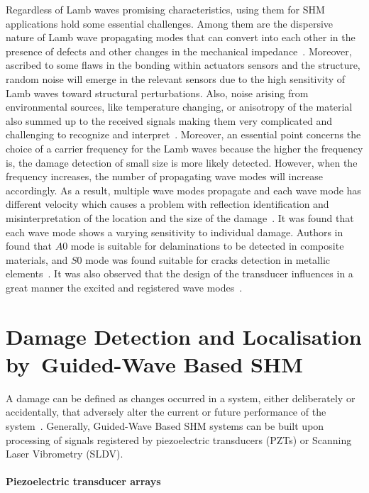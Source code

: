 Regardless of Lamb waves promising characteristics, using them for SHM 
applications hold some essential challenges. 
Among them are the dispersive nature of Lamb wave propagating modes that can convert into each other in the presence of defects and other changes in the mechanical 
impedance~\cite{Willberg2015}. 
Moreover, ascribed to some flaws in the bonding within actuators sensors and 
the structure, random noise will emerge in the relevant sensors due to the high 
sensitivity of Lamb waves toward structural perturbations. 
Also, noise arising from environmental sources, like temperature changing, or 
anisotropy of the material also summed up to the received signals making them 
very complicated and challenging to recognize and interpret~\cite{Willberg2015}.
Moreover, an essential point concerns the choice of a carrier frequency for the 
Lamb waves because the higher the frequency is, the damage detection of small 
size is more likely detected.
However,  when the frequency increases, the number of propagating wave modes will increase accordingly.
As a result, multiple wave modes propagate and each wave mode has different velocity which causes a problem with reflection identification and misinterpretation of the location and the size of the damage~\cite{Ostachowicz2012}. 
It was found that each wave mode shows a varying sensitivity to individual 
damage. 
Authors in~\cite{Kessler2002b,Ihn2008} found that \(A0\) mode is suitable for delaminations to be detected in composite materials, and \(S0\) mode was found suitable for cracks detection in metallic elements~\cite{Ihn2004,Ihn2008}.
It was also observed that the design of the transducer influences in a great manner the excited and registered wave modes~\cite{Ostachowicz2010}.


\section[Damage Detection and Localisation]{Damage Detection and Localisation\\ by~Guided-Wave Based SHM}

A damage can be defined as changes occurred in a system, either deliberately or accidentally, that adversely alter the current or future performance of the system~\cite{Farrar2012}. 
Generally, Guided-Wave Based SHM systems can be built upon processing of signals registered by piezoelectric transducers (PZTs) or Scanning Laser   Vibrometry (SLDV).

\paragraph{Piezoelectric transducer arrays}


